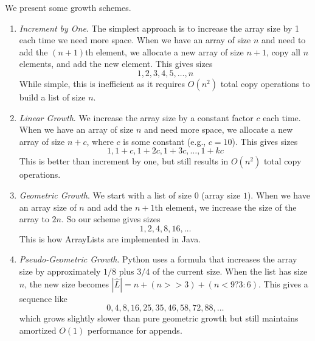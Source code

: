   \begin{example}
    \label{ex:some-growth-schemes}
    We present some growth schemes.
    \begin{enumerate}
      \item \textit{Increment by One}. The simplest approach is to increase the array size by 1 each time we need more space. When we have an array of size $n$ and need to add the $(n+1)$th element, we allocate a new array of size $n+1$, copy all $n$ elements, and add the new element. This gives sizes
      \begin{equation}
        1, 2, 3, 4, 5, \ldots, n
      \end{equation}
      While simple, this is inefficient as it requires $O(n^2)$ total copy operations to build a list of size $n$.

      \item \textit{Linear Growth}. We increase the array size by a constant factor $c$ each time. When we have an array of size $n$ and need more space, we allocate a new array of size $n+c$, where $c$ is some constant (e.g., $c=10$). This gives sizes
      \begin{equation}
        1, 1+c, 1+2c, 1+3c, \ldots, 1+kc
      \end{equation}
      This is better than increment by one, but still results in $O(n^2)$ total copy operations.

      \item \textit{Geometric Growth}. We start with a list of size $0$ (array size $1$). When we have an array size of $n$ and add the $n+1$th element, we increase the size of the array to $2n$. So our scheme gives sizes
      \begin{equation}
        1, 2, 4, 8, 16, \ldots
      \end{equation}
      This is how ArrayLists are implemented in Java. 

      \item \textit{Pseudo-Geometric Growth}.  Python uses a formula that increases the array size by approximately $1/8$ plus $3/4$ of the current size. When the list has size $n$, the new size becomes $|\hat{L}| = n + (n >> 3) + (n < 9 ? 3 : 6)$. This gives a sequence like
      \begin{equation}
        0, 4, 8, 16, 25, 35, 46, 58, 72, 88, \ldots
      \end{equation}
      which grows slightly slower than pure geometric growth but still maintains amortized $O(1)$ performance for appends.
    \end{enumerate}
  \end{example}

